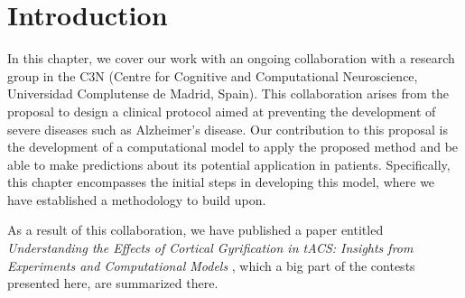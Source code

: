 \documentclass[../main.tex]{subfiles}
\begin{document}
\section{Introduction}

In this chapter, we cover our work with an ongoing collaboration with a research group 
in the  C3N (Centre for Cognitive and Computational Neuroscience, Universidad Complutense de Madrid, Spain).
This collaboration arises from the proposal to design a clinical protocol aimed at preventing the development of severe diseases such as Alzheimer's disease.
Our contribution to this proposal is the development of a computational model to apply the proposed method and be able to make predictions about its potential application in patients.
Specifically, this chapter encompasses the initial steps in developing this model, where we have established a methodology to build upon.

As a result of this collaboration, we have published a paper entitled \textit{Understanding the Effects of Cortical Gyrification in tACS: Insights from Experiments and Computational Models} \citep{cabrera-alvarez_understanding_2023}, which a big part of the contests presented here, are summarized there.
\end{document}
